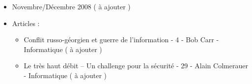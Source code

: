 \documentclass[a4paper,10pt]{report}
\begin{document}
\begin{flushleft}
\begin{itemize}
\begin{itemize}
\begin{itemize}
		\end{itemize}
		\item Novembre/Décembre 2008 ( à ajouter ) 
		\item Articles :
		\begin{itemize}
			\item Conflit russo-géorgien et guerre de l’information - 4 - Bob Carr - Informatique ( à ajouter )
			\item Le très haut débit – Un challenge pour la sécurité - 29 - Alain Colmerauer - Informatique ( à ajouter )
		\end{itemize}
	\end{itemize}
\end{itemize}
 
\end{flushleft}
\end{document}
